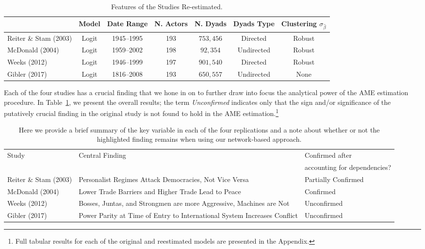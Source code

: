 \begin{table}
\caption{Features of the Studies Re-estimated.}
	\begin{tabular}{lcccccc}
		& Model &  Date Range & N. Actors  & N. Dyads & Dyads Type & Clustering $\sigma_{\hat{\beta}}$ \\ \toprule
		Reiter \& Stam (2003) &Logit &1945--1995 &  193 & $753,456$ & Directed & Robust \\	
		McDonald (2004) & Logit &1959--2002 & 198 & $92,354$ & Undirected & Robust\\
		Weeks (2012) & Logit & 1946--1999 &197 &  $901,540$ & Directed & Robust \\
		Gibler (2017) & Logit & 1816--2008 &193 &   $650,557$ & Undirected & None \\ \bottomrule
	\end{tabular}
\end{table}

Each of the four studies has a crucial finding that we hone in on to further draw into focus the analytical power of the AME estimation procedure.  In Table~\ref{tab:modelFindingSumm}, we present the overall results; the term \textit{Unconfirmed} indicates only that the sign and/or significance of the putatively crucial finding in the original study is not found to hold in the AME estimation.\footnote{Full tabular results for each of the original and reestimated models are presented in the Appendix.}

\begin{table}[ht]
\centering
\caption{Here we provide a brief summary of the key variable in each of the four replications and a note about whether or not the highlighted finding remains when using our network-based approach.}
	\begin{tabular}{l p{7cm} l} \toprule
		\multirow{2}{*}{Study} & \multirow{2}{*}{Central Finding} &  Confirmed after \\
		& &  accounting for dependencies? \\ \toprule
		Reiter \& Stam (2003) & Personalist Regimes Attack Democracies, Not Vice Versa & {Partially Confirmed} \\ \midrule
		McDonald (2004) & Lower Trade Barriers and Higher Trade Lead to Peace & {Confirmed}\\ \midrule
		Weeks (2012) & Bosses, Juntas, and Strongmen are more Aggressive, Machines are Not & {Unconfirmed} \\\midrule
		Gibler (2017) & Power Parity at Time of Entry to International System Increases Conflict & {Unconfirmed}\\ \bottomrule
	\end{tabular}
	\label{tab:modelFindingSumm}
\end{table}

